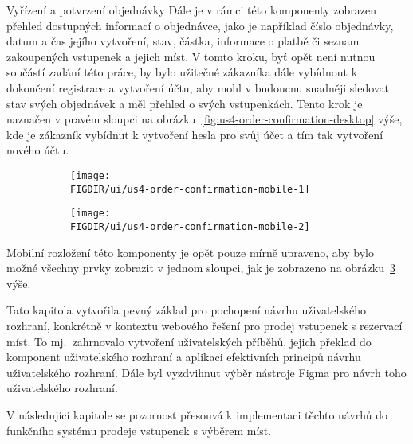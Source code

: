 \begin{subsection}{Vyřízení a potvrzení objednávky}
    Dále je v rámci této komponenty zobrazen přehled dostupných informací o objednávce, jako je například číslo objednávky, datum a čas jejího vytvoření, stav, částka, informace o platbě či seznam zakoupených vstupenek a jejich míst.
    V tomto kroku, byť opět není nutnou součástí zadání této práce, by bylo užitečné zákazníka dále vybídnout k dokončení registrace a vytvoření účtu, aby mohl v budoucnu snadněji sledovat stav svých objednávek a měl přehled o svých vstupenkách.
    Tento krok je naznačen v pravém sloupci na obrázku~\ref{fig:us4-order-confirmation-desktop} výše, kde je zákazník vybídnut k vytvoření hesla pro svůj účet a tím tak vytvoření nového účtu.

    \begin{figure}[H]
        \centering
        \caption{Návrh komponent potvrzení objednávky (mobilní verze)}
        \begin{subfigure}{0.4\textwidth}
            \texttt{[image: \\FIGDIR/ui/us4-order-confirmation-mobile-1]}
            \label{fig:us4-order-confirmation-mobile-1}
        \end{subfigure}
        \hfill
        \begin{subfigure}{0.4\textwidth}
            \texttt{[image: \\FIGDIR/ui/us4-order-confirmation-mobile-2]}
            \label{fig:us4-order-confirmation-mobile-2}
        \end{subfigure}
        \source{}
        \label{fig:us4-order-confirmation-mobile}
    \end{figure}

    Mobilní rozložení této komponenty je opět pouze mírně upraveno, aby bylo možné všechny prvky zobrazit v jednom sloupci, jak je zobrazeno na obrázku~\ref{fig:us4-order-confirmation-mobile} výše.

    Tato kapitola vytvořila pevný základ pro pochopení návrhu uživatelského rozhraní, konkrétně v kontextu webového řešení pro prodej vstupenek s rezervací míst.
    To mj.\ zahrnovalo vytvoření uživatelských příběhů, jejich překlad do komponent uživatelského rozhraní a aplikaci efektivních principů návrhu uživatelského rozhraní.
    Dále byl vyzdvihnut výběr nástroje Figma pro návrh toho uživatelského rozhraní.

    V následující kapitole se pozornost přesouvá k implementaci těchto návrhů do funkčního systému prodeje vstupenek s výběrem míst.
\end{subsection}
